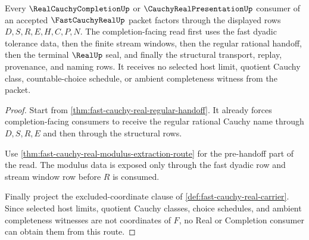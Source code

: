 \begin{theorem}
\label{thm:fast-cauchy-real-completion-consumer-route}
Every $\RealCauchyCompletionUp$ or $\CauchyRealPresentationUp$ consumer of an accepted $\FastCauchyRealUp$ packet factors through the displayed rows $D,S,R,E,H,C,P,N$. The completion-facing read first uses the fast dyadic tolerance data, then the finite stream windows, then the regular rational handoff, then the terminal $\RealUp$ seal, and finally the structural transport, replay, provenance, and naming rows. It receives no selected host limit, quotient Cauchy class, countable-choice schedule, or ambient completeness witness from the packet.
\end{theorem}
\begin{proof}
Start from \autoref{thm:fast-cauchy-real-regular-handoff}. It already forces completion-facing consumers to receive the regular rational Cauchy name through $D,S,R,E$ and then through the structural rows.

Use \autoref{thm:fast-cauchy-real-modulus-extraction-route} for the pre-handoff part of the read. The modulus data is exposed only through the fast dyadic row and stream window row before $R$ is consumed.

Finally project the excluded-coordinate clause of \autoref{def:fast-cauchy-real-carrier}. Since selected host limits, quotient Cauchy classes, choice schedules, and ambient completeness witnesses are not coordinates of $F$, no Real or Completion consumer can obtain them from this route.
\end{proof}


\begin{closurestatus}{\FastCauchyRealUp}
  \theoryclosure{\seedClosure}
  \formalstatus{\unformalizedV}
\end{closurestatus}
